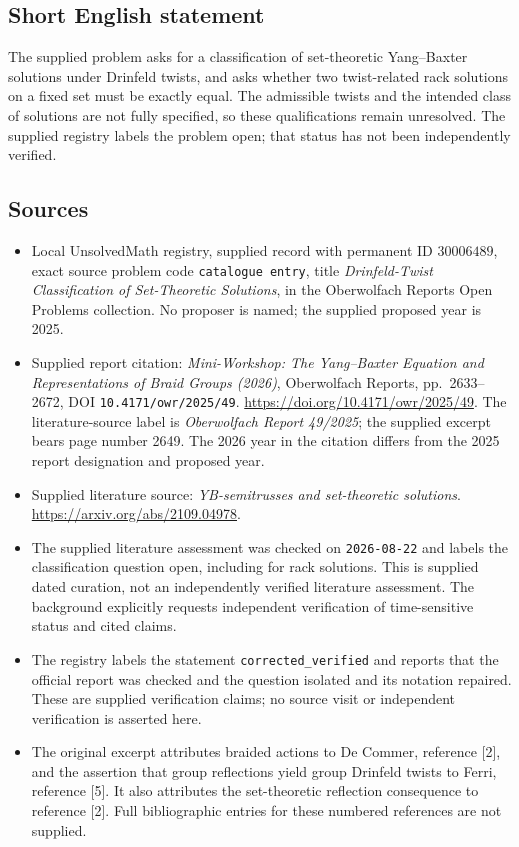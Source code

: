 \documentclass[11pt]{article}
\begin{document}
\subsection{Short English statement}
The supplied problem asks for a classification of set-theoretic Yang--Baxter solutions under Drinfeld twists, and asks whether two twist-related rack solutions on a fixed set must be exactly equal. The admissible twists and the intended class of solutions are not fully specified, so these qualifications remain unresolved. The supplied registry labels the problem open; that status has not been independently verified.
\subsection{Sources}
\begin{itemize}
\item Local UnsolvedMath registry, supplied record with permanent ID \(30006489\), exact source problem code \texttt{catalogue entry}, title \emph{Drinfeld-Twist Classification of Set-Theoretic Solutions}, in the Oberwolfach Reports Open Problems collection. No proposer is named; the supplied proposed year is 2025.
\item Supplied report citation: \emph{Mini-Workshop: The Yang--Baxter Equation and Representations of Braid Groups (2026)}, Oberwolfach Reports, pp.~2633--2672, DOI \texttt{10.4171/owr/2025/49}. \url{https://doi.org/10.4171/owr/2025/49}. The literature-source label is \emph{Oberwolfach Report 49/2025}; the supplied excerpt bears page number 2649. The 2026 year in the citation differs from the 2025 report designation and proposed year.
\item Supplied literature source: \emph{YB-semitrusses and set-theoretic solutions}. \url{https://arxiv.org/abs/2109.04978}.
\item The supplied literature assessment was checked on \texttt{2026-08-22} and labels the classification question open, including for rack solutions. This is supplied dated curation, not an independently verified literature assessment. The background explicitly requests independent verification of time-sensitive status and cited claims.
\item The registry labels the statement \texttt{corrected\_verified} and reports that the official report was checked and the question isolated and its notation repaired. These are supplied verification claims; no source visit or independent verification is asserted here.
\item The original excerpt attributes braided actions to De Commer, reference [2], and the assertion that group reflections yield group Drinfeld twists to Ferri, reference [5]. It also attributes the set-theoretic reflection consequence to reference [2]. Full bibliographic entries for these numbered references are not supplied.
\end{itemize}
\end{document}
